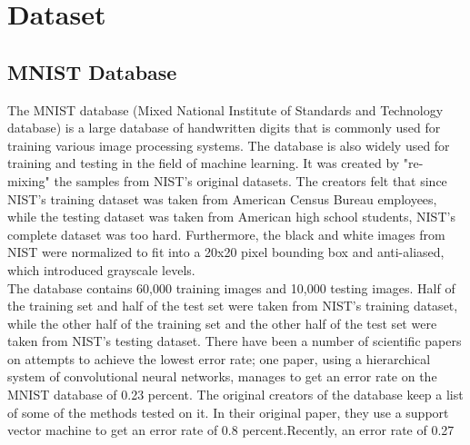 \chapter{Dataset}
%
\section{MNIST Database}
The MNIST database (Mixed National Institute of Standards and Technology database) is a large database of handwritten digits that is commonly used for training various image processing systems. The database is also widely used for training and testing in the field of machine learning. It was created by "re-mixing" the samples from NIST's original datasets. The creators felt that since NIST's training dataset was taken from American Census Bureau employees, while the testing dataset was taken from American high school students, NIST's complete dataset was too hard. Furthermore, the black and white images from NIST were normalized to fit into a 20x20 pixel bounding box and anti-aliased, which introduced grayscale levels.\\
The database contains 60,000 training images and 10,000 testing images. Half of the training set and half of the test set were taken from NIST's training dataset, while the other half of the training set and the other half of the test set were taken from NIST's testing dataset. There have been a number of scientific papers on attempts to achieve the lowest error rate; one paper, using a hierarchical system of convolutional neural networks, manages to get an error rate on the MNIST database of 0.23 percent. The original creators of the database keep a list of some of the methods tested on it. In their original paper, they use a support vector machine to get an error rate of 0.8 percent.Recently, an error rate of 0.27